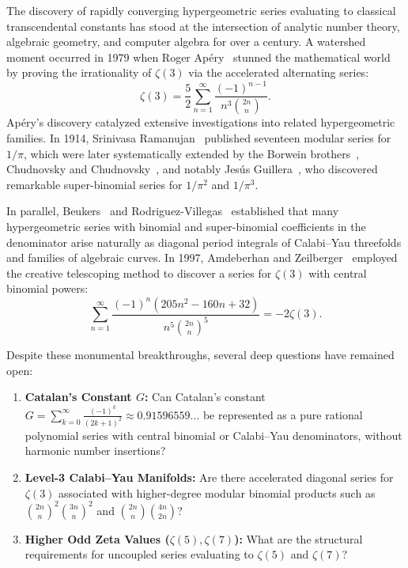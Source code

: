 \documentclass[11pt,a4paper]{article}
\theoremstyle{definition}
\begin{document}
The discovery of rapidly converging hypergeometric series evaluating to classical transcendental constants has stood at the intersection of analytic number theory, algebraic geometry, and computer algebra for over a century. A watershed moment occurred in 1979 when Roger Ap\'ery~\cite{apery1979} stunned the mathematical world by proving the irrationality of $\zeta(3)$ via the accelerated alternating series:
\begin{equation}\label{eq:apery_classical}
\zeta(3) = \frac{5}{2} \sum_{n=1}^\infty \frac{(-1)^{n-1}}{n^3 \binom{2n}{n}}.
\end{equation}
Ap\'ery's discovery catalyzed extensive investigations into related hypergeometric families. In 1914, Srinivasa Ramanujan~\cite{ramanujan1914} published seventeen modular series for $1/\pi$, which were later systematically extended by the Borwein brothers~\cite{borwein1987}, Chudnovsky and Chudnovsky~\cite{chudnovsky1988}, and notably Jes\'us Guillera~\cite{guillera2002,guillera2003,guillera2008}, who discovered remarkable super-binomial series for $1/\pi^2$ and $1/\pi^3$.

In parallel, Beukers~\cite{beukers1987} and Rodriguez-Villegas~\cite{villegas2000} established that many hypergeometric series with binomial and super-binomial coefficients in the denominator arise naturally as diagonal period integrals of Calabi--Yau threefolds and families of algebraic curves. In 1997, Amdeberhan and Zeilberger~\cite{amdeberhan1997} employed the creative telescoping method to discover a series for $\zeta(3)$ with central binomial powers:
\begin{equation}\label{eq:amdeberhan_zeilberger}
\sum_{n=1}^\infty \frac{(-1)^n \left( 205n^2 - 160n + 32 \right)}{n^5 \binom{2n}{n}^5} = -2\zeta(3).
\end{equation}

Despite these monumental breakthroughs, several deep questions have remained open:
\begin{enumerate}
    \item \textbf{Catalan's Constant $G$:} Can Catalan's constant $G = \sum_{k=0}^\infty \frac{(-1)^k}{(2k+1)^2} \approx 0.91596559\dots$ be represented as a pure rational polynomial series with central binomial or Calabi--Yau denominators, without harmonic number insertions?
    \item \textbf{Level-3 Calabi--Yau Manifolds:} Are there accelerated diagonal series for $\zeta(3)$ associated with higher-degree modular binomial products such as $\binom{2n}{n}^2\binom{3n}{n}^2$ and $\binom{2n}{n}\binom{4n}{2n}$?
    \item \textbf{Higher Odd Zeta Values ($\zeta(5), \zeta(7)$):} What are the structural requirements for uncoupled series evaluating to $\zeta(5)$ and $\zeta(7)$?
\end{enumerate}
\end{document}
